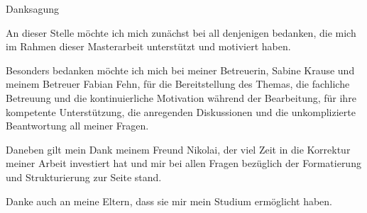 \thispagestyle{empty}

\vspace*{2cm}

\begin{center}
{ Danksagung}
\end{center}

\vspace{1cm}


An dieser Stelle möchte ich mich zunächst bei all denjenigen bedanken, die mich im Rahmen dieser Masterarbeit unterstützt und motiviert haben.

Besonders bedanken möchte ich mich bei meiner Betreuerin, Sabine Krause und meinem Betreuer Fabian Fehn, für die Bereitstellung des Themas, die fachliche Betreuung und die kontinuierliche Motivation während der Bearbeitung, für ihre kompetente Unterstützung, die anregenden Diskussionen und die unkomplizierte Beantwortung all meiner Fragen. 

Daneben gilt mein Dank meinem Freund Nikolai, der viel Zeit in die Korrektur meiner Arbeit investiert hat und mir bei allen Fragen bezüglich der Formatierung und Strukturierung zur Seite stand.

Danke auch an meine Eltern, dass sie mir mein Studium ermöglicht haben. 

\cleardoublepage{}
